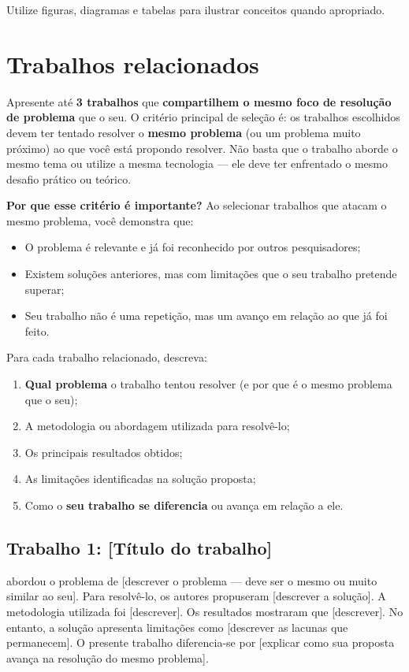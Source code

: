 \documentclass[
    12pt,                %
    openright,           %
    oneside,             %
    a4paper,             %
    english,             %
    brazil               %
]{abntex2}
\begin{document}
Utilize figuras, diagramas e tabelas para ilustrar conceitos quando apropriado.

\section{Trabalhos relacionados}
\label{sec:trabalhos_relacionados}

Apresente até \textbf{3 trabalhos} que \textbf{compartilhem o mesmo foco de resolução de problema} que o seu. O critério principal de seleção é: os trabalhos escolhidos devem ter tentado resolver o \textbf{mesmo problema} (ou um problema muito próximo) ao que você está propondo resolver. Não basta que o trabalho aborde o mesmo tema ou utilize a mesma tecnologia --- ele deve ter enfrentado o mesmo desafio prático ou teórico.

\textbf{Por que esse critério é importante?} Ao selecionar trabalhos que atacam o mesmo problema, você demonstra que:
\begin{itemize}
    \item O problema é relevante e já foi reconhecido por outros pesquisadores;
    \item Existem soluções anteriores, mas com limitações que o seu trabalho pretende superar;
    \item Seu trabalho não é uma repetição, mas um avanço em relação ao que já foi feito.
\end{itemize}

Para cada trabalho relacionado, descreva:
\begin{enumerate}
    \item \textbf{Qual problema} o trabalho tentou resolver (e por que é o mesmo problema que o seu);
    \item A metodologia ou abordagem utilizada para resolvê-lo;
    \item Os principais resultados obtidos;
    \item As limitações identificadas na solução proposta;
    \item Como o \textbf{seu trabalho se diferencia} ou avança em relação a ele.
\end{enumerate}

\subsection{Trabalho 1: [Título do trabalho]}

 abordou o problema de [descrever o problema --- deve ser o mesmo ou muito similar ao seu]. Para resolvê-lo, os autores propuseram [descrever a solução]. A metodologia utilizada foi [descrever]. Os resultados mostraram que [descrever]. No entanto, a solução apresenta limitações como [descrever as lacunas que permanecem]. O presente trabalho diferencia-se por [explicar como sua proposta avança na resolução do mesmo problema].
\end{document}
